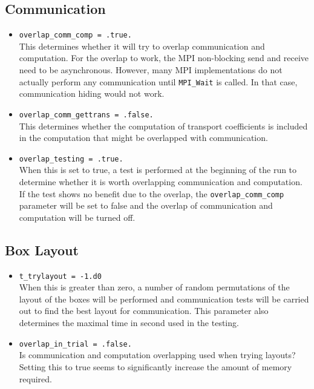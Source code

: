 \documentclass[11pt,letterpaper]{article}
\begin{document}
\subsection{Communication}

\begin{itemize}
\item {\tt overlap\_comm\_comp = .true.}\\
  This determines whether it will try to overlap communication and
  computation.  For the overlap to work, the MPI non-blocking send and
  receive need to be asynchronous.  However, many MPI implementations
  do not actually perform any communication until {\tt MPI\_Wait} is
  called.  In that case, communication hiding would not work.
\item {\tt overlap\_comm\_gettrans = .false.} \\
  This determines whether the computation of transport coefficients is
  included in the computation that might be overlapped with
  communication. 
\item {\tt overlap\_testing = .true.} \\
  When this is set to true, a test is performed at the beginning of
  the run to determine whether it is worth overlapping communication
  and computation.  If the test shows no benefit due to the overlap,
  the {\tt overlap\_comm\_comp} parameter will be set to false and the
  overlap of communication and computation will be turned off.
\end{itemize}

\subsection{Box Layout}
\begin{itemize}
\item {\tt t\_trylayout = -1.d0} \\
  When this is greater than zero, a number of random permutations of
  the layout of the boxes will be performed and communication tests
  will be carried out to find the best layout for communication.  This
  parameter also determines the maximal time in second used in the
  testing.
\item {\tt overlap\_in\_trial = .false.}\\
  Is communication and computation overlapping used when trying
  layouts?  Setting this to true seems to significantly increase the
  amount of memory required.
\end{itemize}
\end{document}
